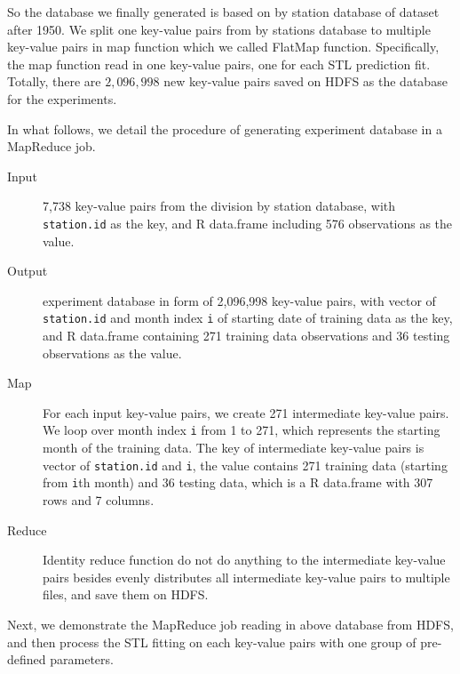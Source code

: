 So the database we finally generated is based on 
by station database of dataset after 1950. We split one key-value pairs from by 
stations database to multiple key-value pairs in map function which we called 
FlatMap function. Specifically, the map function read in one key-value pairs, one
for each STL prediction fit. Totally, there are $2,096,998$ new key-value pairs 
saved on HDFS as the database for the experiments.

In what follows, we detail the procedure of generating experiment database in a 
MapReduce job.

\begin{description}
  \item[Input] 7,738 key-value pairs from the division by station database, with 
  \texttt{station.id} as the key, and R data.frame including 576 observations as
  the value.
  \item[Output] experiment database in form of 2,096,998 key-value pairs, with 
  vector of \texttt{station.id} and month index \texttt{i} of starting date of 
  training data as the key, and R data.frame containing 271 training data 
  observations and 36 testing observations as the value.
  \item[Map] For each input key-value pairs, we create 271 intermediate key-value
  pairs. We loop over month index \texttt{i} from 1 to 271, which represents the
  starting month of the training data. The key of intermediate key-value pairs
  is vector of \texttt{station.id} and \texttt{i}, the value contains 271 
  training data (starting from \texttt{i}th month) and 36 testing data, which is 
  a R data.frame with 307 rows and 7 columns.
  \item[Reduce] Identity reduce function do not do anything to the intermediate 
  key-value pairs besides evenly distributes all intermediate key-value pairs to 
  multiple files, and save them on HDFS.
\end{description} 

Next, we demonstrate the MapReduce job reading in above database from HDFS, and 
then process the STL fitting on each key-value pairs with one group of pre-defined 
parameters. 

